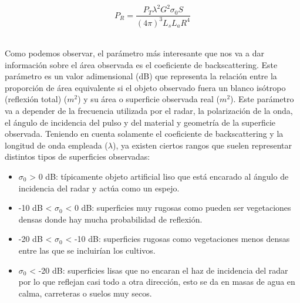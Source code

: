\\
\begin{equation} \label{Pr}
P_{R}=\frac{P_{T}\lambda ^{2}G^{2}\sigma_{0}S}{(4\pi ) ^{3}L_{s}L_{a}R^{4}}
\end{equation}
\\
\par Como podemos observar, el parámetro más interesante que nos va a dar información sobre el área observada es el coeficiente de backscattering. Este parámetro es un valor adimensional (dB) que representa la relación entre la proporción de área equivalente si el objeto observado fuera un blanco isótropo (reflexión total) ($m^{2}$) y su área o superficie observada real ($m^{2}$). Este parámetro va a depender de la frecuencia utilizada por el radar, la polarización de la onda, el ángulo de incidencia del pulso y del material y geometría de la superficie observada. Teniendo en cuenta solamente el coeficiente de backscattering y la longitud de onda empleada ($\lambda$), ya existen ciertos rangos que suelen representar distintos tipos de superficies observadas:
\begin{itemize}
	\item $\sigma_{0}$ > 0 dB: típicamente objeto artificial liso que está encarado al ángulo de incidencia del radar y actúa como un espejo.
	\item -10 dB < $\sigma_{0}$ < 0 dB: superficies muy rugosas como pueden ser vegetaciones densas donde hay mucha probabilidad de reflexión.
	\item -20 dB < $\sigma_{0}$ < -10 dB: superficies rugosas como vegetaciones menos densas entre las que se incluirían los cultivos. 
	\item $\sigma_{0}$ < -20 dB: superficies lisas que no encaran el haz de incidencia del radar por lo que reflejan casi todo a otra dirección, esto se da en masas de agua en calma, carreteras o suelos muy secos. 
\end{itemize}

